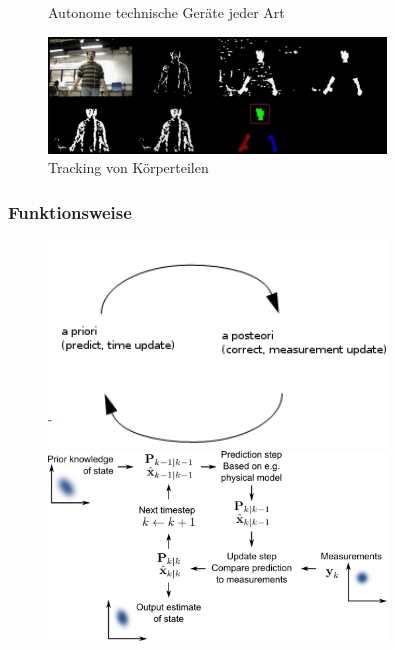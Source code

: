 \documentclass[10pt,a4paper,oneside]{beamer}
\begin{document}
\begin{frame}
\begin{figure}[htbp]
\begin{minipage}{0.3\textwidth}
          \caption{Autonome technische Geräte jeder Art}
        \end{minipage}\hfill
        \begin{minipage}{0.3\textwidth}
         \centering
          \includegraphics[width=0.8\textwidth]{images/head-tracking.jpg}
          \caption{Tracking von Körperteilen}
        \end{minipage}
      \end{figure}
\end{frame}
\begin{frame}
  \frametitle{Funktionsweise}
   \begin{figure}[htbp]
          \begin{minipage}{0.4\textwidth}
           \centering
            \includegraphics[width=0.8\textwidth]{images/grundfunktion.jpg}
          \end{minipage}\hfill
          \begin{minipage}{0.4\textwidth}
           \centering
            \includegraphics[width=0.8\textwidth]{images/Funktionsprinzip.png}
          \end{minipage}\hfill
   \end{figure}
\end{frame}
\end{document}
